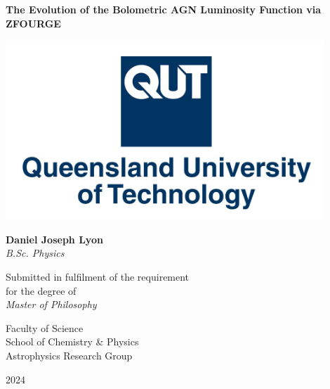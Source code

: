 \begin{titlepage}
    \begin{center}
    
        {\Huge{\textbf{The Evolution of \vspace{1mm} the Bolometric AGN Luminosity Function via ZFOURGE}}}\\
        \vspace{1.5cm}

        \includegraphics[width=12cm]{Images/QUT Emblem.jpg}\\
        \vspace{1.5cm}

        \Large{\textbf{Daniel Joseph Lyon}}\\
        \textit{B.Sc. Physics}\\
        \vspace{1cm}

        Submitted in fulfilment of the requirement \\ for the degree of\\
        \vspace{0.5cm}
        \textit{Master of Philosophy}\\
        \vspace{0.75cm}

        \normalsize{Faculty of Science}\\
        School of Chemistry \& Physics\\
        Astrophysics Research Group\\
        \vfill
        
        \Large{2024}
            
    \end{center}
\end{titlepage}